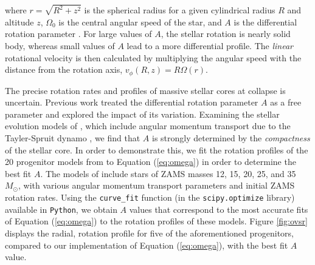 \documentclass[twocolumn,times]{aastex62}  %
\begin{document}
where $r = \sqrt{R^2 + z^2}$ is the spherical radius for a given cylindrical radius $R$ and altitude $z$, $\Omega_0$ is the central angular speed of the star, and $A$ is the differential rotation parameter \citep{eriguchi:1984}.  For large values of $A$, the stellar rotation is nearly solid body, whereas small values of $A$ lead to a more differential profile. 
The {\it linear} rotational velocity is then calculated by multiplying the angular speed with the distance from the rotation axis, $v_\phi (R, z) = R \Omega (r) $. 

The precise rotation rates and profiles of massive stellar cores at collapse is uncertain.
Previous work \citep[e.g.,][]{abdik:2014} treated the differential rotation parameter $A$ as a free parameter and explored the impact of its variation.
Examining the stellar evolution models of \citet{heger:2005}, which include angular momentum transport due to the Tayler-Spruit dynamo \citep{spruit:2002}, we find that $A$ is strongly determined by the {\it compactness} \citep{oconnor:2011} of the stellar core.
In order to demonstrate this, we fit the rotation profiles of the 20 progenitor models from \citet{heger:2005} to Equation (\ref{eq:omega}) in order to determine the best fit $A$.
The models of \citet{heger:2005} include stars of ZAMS masses 12, 15, 20, 25, and 35 $M_{\odot}$, with various angular momentum transport parameters and initial ZAMS rotation rates.  
Using the \texttt{curve\_fit} function (in the \texttt{scipy.optimize} library) available in \texttt{Python}, we obtain $A$ values that correspond to the most accurate fits of Equation (\ref{eq:omega}) to the rotation profiles of these models.  Figure \ref{fig:ovsr} displays the radial, rotation profile for five of the aforementioned progenitors, compared to our implementation of Equation (\ref{eq:omega}), with the best fit $A$ value.
\end{document}
